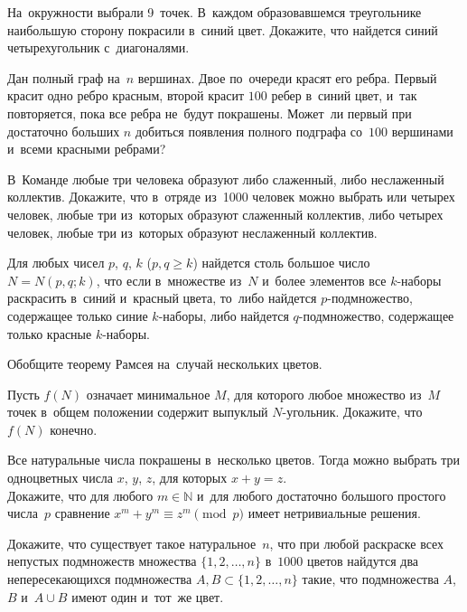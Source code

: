 


\begin{problems}

\item
На~окружности выбрали 9~точек.
В~каждом образовавшемся треугольнике наибольшую сторону покрасили в~синий цвет.
Докажите, что найдется синий четырехугольник с~диагоналями.

\item
Дан полный граф на~$n$ вершинах.
Двое по~очереди красят его ребра.
Первый красит одно ребро красным, второй красит $100$ ребер в~синий цвет, и~так
повторяется, пока все ребра не~будут покрашены.
Может~ли первый при достаточно больших $n$ добиться появления полного подграфа
со~$100$ вершинами и~всеми красными ребрами?

\item
В~Команде любые три человека образуют либо слаженный, либо
неслаженный коллектив.
Докажите, что в~отряде из~1000 человек можно выбрать или четырех человек, любые
три из~которых образуют слаженный коллектив, либо четырех человек, любые три
из~которых образуют неслаженный коллектив.

\item{}
Для любых чисел $p$, $q$, $k$ ($p, q \geq k$) найдется столь большое число
$N = N(p, q; k)$, что если в~множестве из~$N$ и~более элементов все $k$-наборы
раскрасить в~синий и~красный цвета, то~либо найдется $p$-подмножество,
содержащее только синие $k$-наборы, либо найдется $q$-подмножество, содержащее
только красные $k$-наборы.

\item
Обобщите теорему Рамсея на~случай нескольких цветов.

\item
Пусть $f(N)$ означает минимальное $M$, для которого любое множество
из~$M$ точек в~общем положении содержит выпуклый $N$-угольник.
Докажите, что $f(N)$ конечно.

\item
\subproblem{}
Все натуральные числа покрашены в~несколько цветов.
Тогда можно выбрать три одноцветных числа $x$, $y$, $z$, для которых
$x + y = z$.
\\
\subproblem
Докажите, что для любого $m \in \mathbb{N}$ и~для любого достаточно большого
простого числа~$p$ сравнение $x^{m} + y^{m} \equiv z^{m} \pmod{p}$ имеет
нетривиальные решения.

\item
Докажите, что существует такое натуральное~$n$, что при любой раскраске всех
непустых подмножеств множества $\{ 1, 2, \ldots, n \}$ в~$1000$ цветов найдутся
два непересекающихся подмножества $A, B \subset \{1, 2, \ldots, n\}$ такие, что
подмножества $A$, $B$ и~$A \cup B$ имеют один и~тот~же цвет.

\end{problems}

